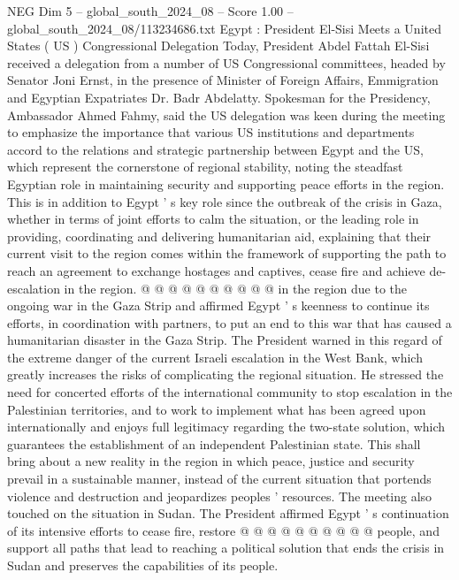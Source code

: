 \begin{textsample}{NEG Dim 5 – global\_south\_2024\_08 – Score 1.00 – global\_south\_2024\_08/113234686.txt}  \label{ex:f5_neg_176}
Egypt : President El-Sisi Meets a United States ( US ) Congressional Delegation Today, President Abdel Fattah El-Sisi received a delegation from a number of US Congressional committees, headed by Senator Joni Ernst, in the presence of Minister of Foreign Affairs, Emmigration and Egyptian Expatriates Dr.
Badr Abdelatty.
Spokesman for the Presidency, Ambassador Ahmed Fahmy, said the US delegation was keen during the meeting to emphasize the importance that various US institutions and departments accord to the relations and strategic partnership between Egypt and the US, which represent the cornerstone of regional stability, noting the steadfast Egyptian role in maintaining security and supporting peace efforts in the region.
This is in addition to Egypt ' s key role since the outbreak of the crisis in Gaza, whether in terms of joint efforts to calm the situation, or the leading role in providing, coordinating and delivering humanitarian aid, explaining that their current visit to the region comes within the framework of supporting the path to reach an agreement to exchange hostages and captives, cease fire and achieve de-escalation in the region. @ @ @ @ @ @ @ @ @ @ in the region due to the ongoing war in the Gaza Strip and affirmed Egypt ' s keenness to continue its efforts, in coordination with partners, to put an end to this war that has caused a humanitarian disaster in the Gaza Strip.
The President warned in this regard of the extreme danger of the current Israeli escalation in the West Bank, which greatly increases the risks of complicating the regional situation.
He stressed the need for concerted efforts of the international community to stop escalation in the Palestinian territories, and to work to implement what has been agreed upon internationally and enjoys full legitimacy regarding the two-state solution, which guarantees the establishment of an independent Palestinian state.
This shall bring about a new reality in the region in which peace, justice and security prevail in a sustainable manner, instead of the current situation that portends violence and destruction and jeopardizes peoples ' resources.
The meeting also touched on the situation in Sudan.
The President affirmed Egypt ' s continuation of its intensive efforts to cease fire, restore @ @ @ @ @ @ @ @ @ @ people, and support all paths that lead to reaching a political solution that ends the crisis in Sudan and preserves the capabilities of its people.

\end{textsample}

